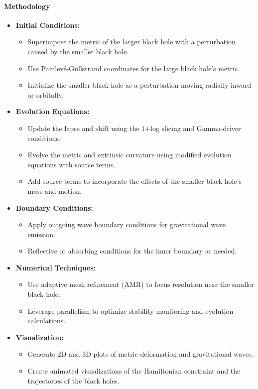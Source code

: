 \documentclass[12pt]{article}
\begin{document}
\paragraph{Methodology}
\begin{itemize}
    \item \textbf{Initial Conditions:}
    \begin{itemize}
        \item Superimpose the metric of the larger black hole with a perturbation caused by the smaller black hole.
        \item Use Painlevé-Gullstrand coordinates for the large black hole's metric.
        \item Initialize the smaller black hole as a perturbation moving radially inward or orbitally.
    \end{itemize}
    \item \textbf{Evolution Equations:}
    \begin{itemize}
        \item Update the lapse and shift using the 1+log slicing and Gamma-driver conditions.
        \item Evolve the metric and extrinsic curvature using modified evolution equations with source terms.
        \item Add source terms to incorporate the effects of the smaller black hole's mass and motion.
    \end{itemize}
    \item \textbf{Boundary Conditions:}
    \begin{itemize}
        \item Apply outgoing wave boundary conditions for gravitational wave emission.
        \item Reflective or absorbing conditions for the inner boundary as needed.
    \end{itemize}
    \item \textbf{Numerical Techniques:}
    \begin{itemize}
        \item Use adaptive mesh refinement (AMR) to focus resolution near the smaller black hole.
        \item Leverage parallelism to optimize stability monitoring and evolution calculations.
    \end{itemize}
    \item \textbf{Visualization:}
    \begin{itemize}
        \item Generate 2D and 3D plots of metric deformation and gravitational waves.
        \item Create animated visualizations of the Hamiltonian constraint and the trajectories of the black holes.
    \end{itemize}
\end{itemize}
\end{document}
